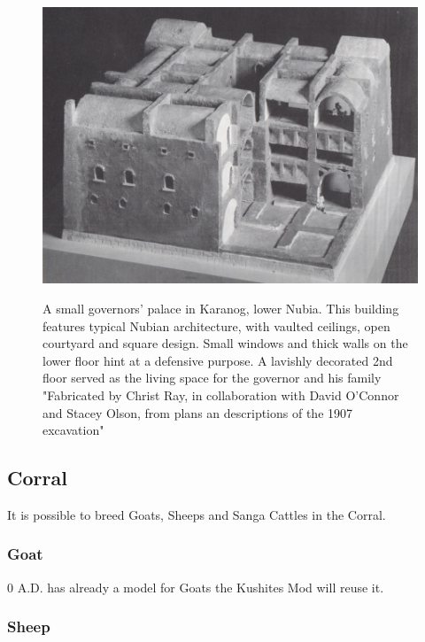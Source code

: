 \documentclass[a4paper,12pt]{scrreprt}
\begin{document}
\begin{figure}[H]
	\centering
	\includegraphics[width=\textwidth]{img/civic_center/governor_palace_karanog}\label{fig:karanog_governor_palace}
	\caption{A small governors' palace in Karanog, lower Nubia. This building features typical Nubian architecture, with vaulted ceilings, open courtyard and square design. Small windows and thick walls on the lower floor hint at a defensive purpose. A lavishly decorated 2nd floor served as the living space for the governor and his family "Fabricated by Christ Ray, in collaboration with David O'Connor and Stacey Olson, from plans an descriptions of the 1907 excavation"}
\end{figure}

\subsection{Corral}

It is possible to breed Goats, Sheeps and Sanga Cattles in the Corral.


\subsubsection{Goat}

0 A.D. has already a model for Goats the Kushites Mod will reuse it.

\subsubsection{Sheep}
\end{document}
